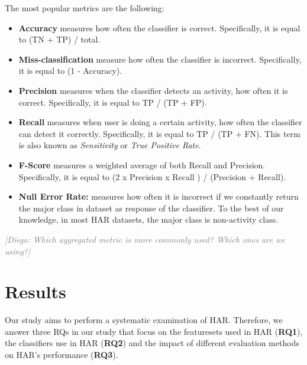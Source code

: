 \documentclass[journal,article,submit,moreauthors,pdftex]{Definitions/mdpi}
\newcommand{\diego}[1]{\textcolor{gray}{{\it [Diego: #1]}}}
\begin{document}
The most popular metrics are the following:\\

\begin{itemize}

\item \noindent \textbf{Accuracy} measures how often the classifier is correct. Specifically, it is equal to (TN + TP) / total.\\

\item \noindent \textbf{Miss-classification} measure how often the classifier is incorrect. Specifically, it is equal to (1 - Accuracy).

\item \noindent \textbf{Precision} measures when the classifier detects an activity, how often it is  correct. Specifically, it is equal to TP / (TP + FP). \\

\item \noindent \textbf{Recall} measures when user is doing a certain activity, how often the classifier can detect it correctly. Specifically, it is equal to TP / (TP + FN). This term is also known as \textit{Sensitivity} or \textit{True Positive Rate}.\\

\item \noindent \textbf{F-Score} measures a weighted average of both Recall and Precision. Specifically, it is equal to (2 x Precision x Recall ) / (Precision + Recall). \\

\item \noindent \textbf{Null Error Rate:} measures how often it is incorrect if we constantly return the major class in dataset as response of the classifier. To the best of our knowledge, in most HAR datasets, the major class is non-activity class.\\

\end{itemize}

\diego{Which aggregated metric is more commonly used? Which ones are we using?}


\section{Results}
Our study aims to perform a systematic examination of HAR. Therefore, we answer three RQs in our study that focus on the featuresets used in HAR (\textbf{RQ1}), the classifiers use in HAR (\textbf{RQ2}) and the impact of different evaluation methods on HAR's performance (\textbf{RQ3}).
\end{document}
